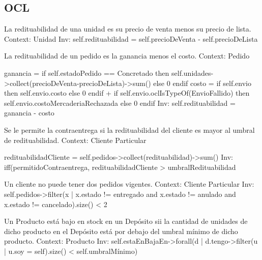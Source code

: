 \subsection{OCL}

\begin{listocl}
  \begin{itemocl}{La redituabilidad de una unidad es su precio de venta menos su precio de lista.}
Context: Unidad
Inv: self.redituabilidad = self.precioDeVenta - self.precioDeLista
  \end{itemocl}

  \begin{itemocl}{La redituabilidad de un pedido es la ganancia menos el costo.}
Context: Pedido

ganancia = if self.estadoPedido == Concretado
	   then self.unidades->collect(precioDeVenta-precioDeLista)->sum()
	   else 0
	   endif
costo = if self.envio
	then self.envio.costo
	else 0
	endif
	+ if self.envio.oclIsTypeOf(EnvioFallido)
	then self.envio.costoMercaderiaRechazada
	else 0
	endif
Inv: self.redituabilidad = ganancia - costo
  \end{itemocl}

  \begin{itemocl}{Se le permite la contraentrega si la redituabilidad del cliente es mayor al umbral de redituabilidad.}
Context: Cliente Particular

redituabilidadCliente = self.pedidos->collect(redituabilidad)->sum()
Inv: iff(permitidoContraentrega, redituabilidadCliente > umbralRedituabilidad
  
  \end{itemocl}

  \begin{itemocl}{Un cliente no puede tener dos pedidos vigentes.}
Context: Cliente Particular
Inv: self.pedidos->filter(x | x.estado != entregado and x.estado != anulado and x.estado != cancelado).size() < 2
  \end{itemocl}

  \begin{itemocl}{Un Producto está bajo en stock en un Depósito sii la cantidad de unidades de dicho producto en el Depósito está por debajo del umbral mínimo de dicho producto.}
Context: Producto
Inv: self.estaEnBajaEn->forall(d | d.tengo->filter(u | u.soy = self).size() < self.umbralMínimo)
  \end{itemocl}

\end{listocl}
